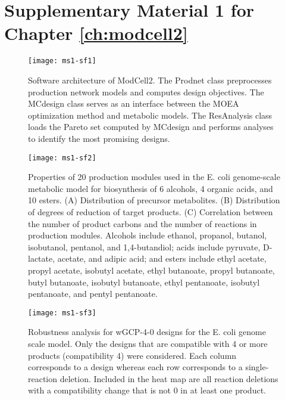 \section{Supplementary Material 1 for Chapter \ref{ch:modcell2}} \label{apx:sm1-modcell2}


\newcommand{\hbAppendixPrefix}{A}
%
\renewcommand{\thefigure}{\hbAppendixPrefix\arabic{figure}}
\setcounter{figure}{0}
\renewcommand{\thetable}{\hbAppendixPrefix\arabic{table}}
\setcounter{table}{0}
\renewcommand{\theequation}{\hbAppendixPrefix\arabic{equation}}
\setcounter{equation}{0}

\begin{figure}[h]
  \centering
  \texttt{[image: ms1-sf1]}
    \caption[Software architecture of ModCell2]{Software architecture of ModCell2. The Prodnet class preprocesses production network models and computes design objectives. The MCdesign class serves as an interface between the MOEA optimization method and metabolic models. The ResAnalysis class loads the Pareto set computed by MCdesign and performs analyses to identify the most promising designs.}
\end{figure}

\begin{figure}[h]
  \centering
  \texttt{[image: ms1-sf2]}
    \caption[Biochemical properties of production modules]{Properties of 20 production modules used in the E. coli genome-scale metabolic model for biosynthesis of 6 alcohols, 4 organic acids, and 10 esters. (A) Distribution of precursor metabolites. (B) Distribution of degrees of reduction of target products. (C) Correlation between the number of product carbons and the number of reactions in production modules. Alcohols include ethanol, propanol, butanol, isobutanol, pentanol, and 1,4-butandiol; acids include pyruvate, D-lactate, acetate, and adipic acid; and esters include ethyl acetate, propyl acetate, isobutyl acetate, ethyl butanoate, propyl butanoate, butyl butanoate, isobutyl butanoate, ethyl pentanoate, isobutyl pentanoate, and pentyl pentanoate.
    }
\end{figure}

\begin{figure}[h]
  \centering
  \texttt{[image: ms1-sf3]}
    \caption[Robustness analysis of designs]{Robustness analysis for wGCP-4-0 designs for the E. coli genome scale model. Only the designs that are compatible with 4 or more products (compatibility  4) were considered. Each column corresponds to a design whereas each row corresponds to a single-reaction deletion. Included in the heat map are all reaction deletions with a compatibility change that is not 0 in at least one product.
    }
\end{figure}

